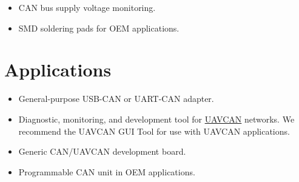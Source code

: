 \documentclass{zubaxdoc}
\begin{document}
\begin{titlepage}
\begin{itemize}
    \item CAN bus supply voltage monitoring.

    \item SMD soldering pads for OEM applications.
\end{itemize}

\BeginRightColumn

\section*{Applications}

\begin{itemize}
    \item General-purpose USB-CAN or UART-CAN adapter.
    \item Diagnostic, monitoring, and development tool for \href{http://uavcan.org}{UAVCAN} networks.
          We recommend the UAVCAN GUI Tool for use with UAVCAN applications.
    \item Generic CAN/UAVCAN development board.
    \item Programmable CAN unit in OEM applications.
\end{itemize}


\end{titlepage}

\tableofcontents
\BeginRightColumn
\listoffigures
\listoftables

\mainmatter
\end{document}

